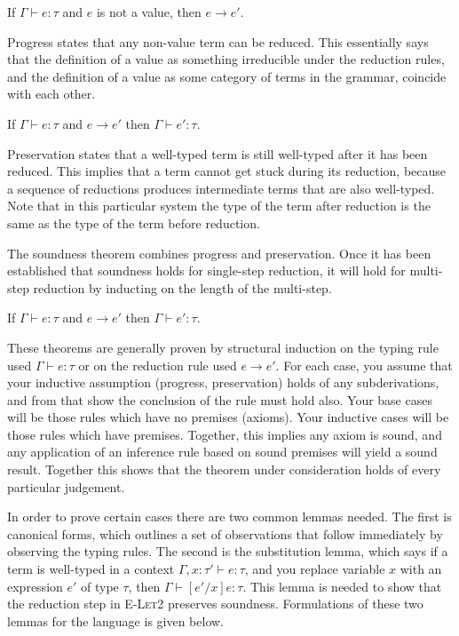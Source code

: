 \begin{theorem}[Progress]
If $\Gamma \vdash e: \tau$ and $e$ is not a value, then $e \longrightarrow e'$.
\end{theorem}

Progress states that any non-value term can be reduced. This essentially says that the definition of a value as something irreducible under the reduction rules, and the definition of a value as some category of terms in the grammar, coincide with each other.

\begin{theorem}[Preservation]
If $\Gamma \vdash e: \tau$ and $e \longrightarrow e'$ then $\Gamma \vdash e': \tau$.
\end{theorem}

Preservation states that a well-typed term is still well-typed after it has been reduced. This implies that a term cannot get stuck during its reduction, because a sequence of reductions produces intermediate terms that are also well-typed. Note that in this particular system the type of the term after reduction is the same as the type of the term before reduction.

The soundness theorem combines progress and preservation. Once it has been established that soundness holds for single-step reduction, it will hold for multi-step reduction by inducting on the length of the multi-step.

\begin{theorem}[Soundness]
If $\Gamma \vdash e: \tau$ and $e \longrightarrow e'$ then $\Gamma \vdash e': \tau$.
\end{theorem}

These theorems are generally proven by structural induction on the typing rule used $\Gamma \vdash e: \tau$ or on the reduction rule used $e \rightarrow e'$. For each case, you assume that your inductive assumption (progress, preservation) holds of any subderivations, and from that show the conclusion of the rule must hold also. Your base cases will be those rules which have no premises (axioms). Your inductive cases will be those rules which have premises. Together, this implies any axiom is sound, and any application of an inference rule based on sound premises will yield a sound result. Together this shows that the theorem under consideration holds of every particular judgement.

In order to prove certain cases there are two common lemmas needed. The first is canonical forms, which outlines a set of observations that follow immediately by observing the typing rules. The second is the substitution lemma, which says if a term is well-typed in a context $\Gamma, x: \tau' \vdash e: \tau$, and you replace variable $x$ with an expression $e'$ of type $\tau$, then $\Gamma \vdash [e'/x]e: \tau$. This lemma is needed to show that the reduction step in \textsc{E-Let2} preserves soundness. Formulations of these two lemmas for the language is given below.

